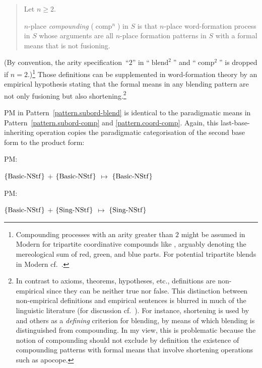 \documentclass[output=paper
  ,nobabel
  ,draftmode
  ,colorlinks, citecolor=brown
]{langscibook}
\begin{document}
\begin{quotation}
\begin{definition}
\label{definition.compounding}Let $n≥2$.

\noindent $n$-place \emph{compounding} ($\operatorname{comp}^{n}$) in $S$ is that $n$-place word-formation process in $S$ whose arguments are all $n$-place formation patterns in $S$ with a formal means that is not fusioning.
\end{definition}
\end{quotation} (By convention, the arity specification ``$2$'' in ``$\operatorname{blend}^{2}$'' and ``$\operatorname{comp}^{2}$'' is dropped if $n=2$.)\footnote{Compounding processes with an arity greater than $2$ might be assumed in Modern  for tripartite coordinative
compounds like \emph{},
arguably denoting the mereological sum of red, green, and blue parts. For
potential tripartite blends in Modern  cf.\ \citet[Section 4.6]{friedrich:2008:kontamination:form}.} Those
definitions can be supplemented in word-formation theory by an empirical
hypothesis stating that the formal means in any blending pattern are not only
fusioning but also shortening.\footnote{In contrast to axioms, theorems, hypotheses,
etc., definitions are non-empirical since they can be neither true nor false.
This distinction between non-empirical definitions and empirical sentences is
blurred in much of the linguistic literature (for discussion cf.\ \citealt[Section 2.2]{budde:2012:woerter:saetze}). For
instance, shortening is used by \citet[78]{mueller:et:al:2011:kontamination} and others as a
\emph{defining} criterion for blending, by means of which blending is
distinguished from compounding. In my view, this is problematic because the
notion of compounding should not exclude by definition the existence of
compounding patterns with formal means that involve shortening operations such
as apocope.}

PM in Pattern \ref{pattern.subord-blend} is
identical to the paradigmatic means in Pattern \ref{pattern.subord-comp} and \ref{pattern.coord-comp}. Again, this last-base-inheriting operation copies
the paradigmatic categorisation of the second base form to the product form:
\begin{exe}
\ex \begin{xlist}
\ex \raggedright
\begin{labeledlist}{PM:}
\item[PM:] \raggedright $\left\{\smash{\operatorname{Basic-NStf}}\right\}$ $+$ $\left\{\smash{\operatorname{Basic-NStf}}\right\}$ $↦$ $\left\{\smash{\operatorname{Basic-NStf}}\right\}$
\end{labeledlist}
\ex \raggedright
\begin{labeledlist}{PM:}
\item[PM:] \raggedright $\left\{\smash{\operatorname{Basic-NStf}}\right\}$ $+$ $\left\{\smash{\operatorname{Sing-NStf}}\right\}$ $↦$ $\left\{\smash{\operatorname{Sing-NStf}}\right\}$
\end{labeledlist}
\end{xlist}
\end{exe}
\end{document}
